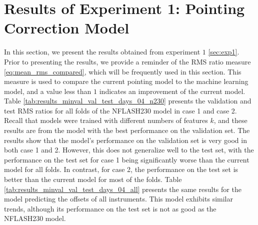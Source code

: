 
\section{Results of Experiment 1: Pointing Correction Model}
In this section, we present the results obtained from experiment $1$ \ref{sec:exp1}.
Prior to presenting the results, we provide a reminder of the RMS ratio measure \eqref{eq:mean_rms_compared}, which will be frequently used in this section.
This measure is used to compare the current pointing model to the machine learning model, and a value less than $1$ indicates an improvement of the current model. \\

Table \ref{tab:results_minval_val_test_days_04_n230} presents the validation and test RMS ratios for all folds of the NFLASH230 model in case 1 and case 2.
Recall that models were trained with different numbers of features $k$, and these results are from the model with the best performance on the validation set.
The results show that the model's performance on the validation set is very good in both case 1 and 2.
However, this does not generalize well to the test set, with the performance on the test set for case 1 being significantly worse than the current model for all folds.
In contrast, for case 2, the performance on the test set is better than the current model for most of the folds.
Table \ref{tab:results_minval_val_test_days_04_all} presents the same results for the model predicting the offsets of all instruments.
This model exhibits similar trends, although its performance on the test set is not as good as the NFLASH230 model.\\

